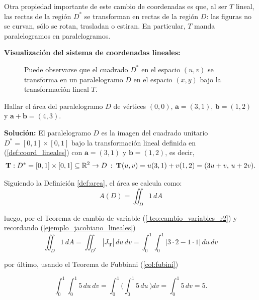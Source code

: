 Otra propiedad importante de este cambio de coordenadas es que, al ser $T$ lineal, las rectas de la regi\'on $D^*$ se transforman en rectas de la regi\'on $D$: las figuras no se curvan, s\'olo se rotan, trasladan o estiran. En particular, $T$ manda paralelogramos en paralelogramos.

\vspace{0.2cm}

\textbf{Visualizaci\'on del sistema de coordenadas lineales:}
\begin{figure}[htbp]
    \centering
     
    \label{fig:Visualizacion lineales}
    \caption{Puede observarse que el cuadrado $D^*$ en el espacio $(u,v)$ se transforma en un paralelogramo $D$ en el espacio $(x,y)$ bajo la transformaci\'on lineal $T$.}
\end{figure}


\begin{example}
Hallar el \'area del paralelogramo $D$ de v\'ertices $(0,0)$, $\mathbf{a}=(3,1)$, $\mathbf{b}=(1,2)$ y $\mathbf{a}+\mathbf{b}=(4,3)$.
\end{example}

\textbf{Soluci\'on:} El paralelogramo $D$ es la imagen del cuadrado unitario $D^*=[0,1]\times[0,1]$ bajo la transformaci\'on lineal definida en (\ref{def:coord_lineales}) con $\mathbf{a}=(3,1)$ y $\mathbf{b}=(1,2)$, es decir,
\begin{equation*}
\mathbf{T}:D^*=[0,1]\times[0,1] \subseteq\mathbb{R}^2 \to D\: : \: \mathbf{T}(u, v ) = u(3,1) + v(1,2) = (3u+v,\, u+2v).
\end{equation*}

Siguiendo la Definici\'on \ref{def:area}, el \'area se calcula como:
\begin{equation*}
A(D) = \iint_D 1\, dA
\end{equation*}

luego, por el Teorema de cambio de variable (\ref{ teo:cambio_variables_r2}) y recordando (\ref{ejemplo_jacobiano_lineales})
$$ \iint_D 1\, dA = \iint_{D^*} |J_\mathbf{T}|\, du\, dv= \int_0^{1} \int_0^1 |3\cdot 2 - 1 \cdot 1|\, du\, dv $$

por \'ultimo, usando el Teorema de Fubbinni (\ref{col:fubini})

\begin{equation*}
\int_0^{1} \int_0^1 5\, du\, dv = \int_0^{1} \Big(  \int_0^1 5\, du\,  \Big) dv  =  \int_0^{1}  5 \, dv = 5.
\end{equation*}
